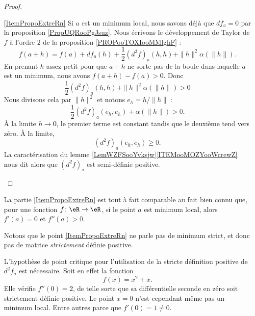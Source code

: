 \begin{proof}
\begin{subproof}
    \item[\ref{ItemPropoExtreRn}]
    Si \( a\) est un minimum local, nous savons déjà que \( df_a=0\) par la proposition \ref{PropUQRooPgJsuz}. Nous écrivons le développement de Taylor de \( f\) à l'ordre \( 2\) de la proposition \ref{PROPooTOXIooMMlghF} :
    \begin{equation}
        f(a+h)=f(a)+df_a(h)+\frac{ 1 }{2}(d^2f)_a(h,h)+\| h \|^2\alpha(\| h \|).
    \end{equation}
    En prenant \( h\) assez petit pour que \( a+h\) ne sorte pas de la boule dans laquelle \( a\) est un minimum, nous avons \( f(a+h)-f(a)>0\). Donc
    \begin{equation}
        \frac{ 1 }{2}(d^2f)_a(h,h)+\| h \|^2\alpha(\| h \|)>0
    \end{equation}
    Nous divisons cela par \( \| h \|^2\) et notons \( e_h=h/\| h \|\) :
    \begin{equation}
        \frac{ 1 }{2}(d^2f)_a(e_h,e_h)+\alpha(\| h \|)>0.
    \end{equation}
    À la limite \( h\to 0\), le premier terme est constant tandis que le deuxième tend vers zéro. À la limite,
    \begin{equation}
        (d^2f)_a(e_h,e_h)\geq 0.
    \end{equation}
    La caractérisation du lemme \ref{LemWZFSooYvksjw}\ref{ITEMooMOZYooWcrewZ} nous dit alors que \( (d^2f)_a\) est semi-définie positive.
    \end{subproof}
\end{proof}

La partie \ref{ItemPropoExtreRn} est tout à fait comparable au fait bien connu que, pour une fonction $f\colon \eR\to \eR$, si le point $a$ est minimum local, alors $f'(a)=0$ et $f''(a)>0$.

Notons que le point \ref{ItemPropoExtreRn} ne parle pas de minimum strict, et donc pas de matrice \emph{strictement} définie positive.

\begin{example}
    L'hypothèse de point critique pour l'utilisation de la stricte définition positive de \( d^2f_a\) est nécessaire. Soit en effet la fonction
    \begin{equation}
        f(x)=x^2+x.
    \end{equation}
    Elle vérifie \( f''(0)=2\), de telle sorte que sa différentielle seconde en zéro soit strictement définie positive. Le point \( x=0\) n'est cependant même pas un minimum local. Entre autres parce que \( f'(0)=1\neq 0\).
\end{example}

